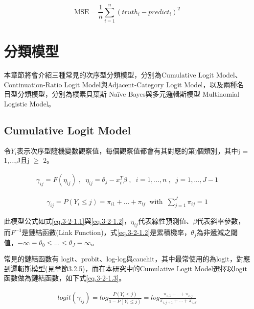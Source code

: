 \begin{equation}\label{eq.1.3.1}
\text{MSE}=\frac{1}{n}\sum_{i=1}^{n}(truth_i-predict_i)^2
\end{equation}
	
	
\section{分類模型}
	
	本章節將會介紹三種常見的次序型分類模型，分別為Cumulative Logit Model、Continuation-Ratio Logit Model與Adjacent-Category Logit Model，以及兩種名目型分類模型，分別為樸素貝葉斯 Naïve Bayes與多元邏輯斯模型 Multinomial Logistic Model。
	
\subsection{Cumulative Logit Model}

	令$Y_i$表示次序型隨機變數觀察值，每個觀察值都會有其對應的第j個類別，其中j = 1,...,\;J且j $\geq $ 2。
	
\begin{equation}
\label{eq.3-2-1.1}
\begin{aligned}
	\gamma_{ij} = F(\eta_{ij})\;,\;\; \eta_{ij} = \theta_j - x^{T}_i\beta \;,\;\; i = 1,...,n\;,\;\; j=1,...,J-1 
\end{aligned}
\end{equation}

\begin{equation}
\label{eq.3-2-1.2}
\begin{aligned}
	\gamma_{ij} = P(Y_i\leq j) = \pi_{i1} + ... + \pi_{ij}\;\; \text{with} \;\; \sum_{j=1}^{J} \pi_{ij} = 1
\end{aligned}
\end{equation}
	
	此模型公式如式\ref{eq.3-2-1.1}與\ref{eq.3-2-1.2}，$\eta_{ij}$代表線性預測值、$\beta$代表斜率參數，而$F^{-1}$是鏈結函數(Link Function)，式\ref{eq.3-2-1.2}是累積機率，$\theta_j$為非遞減之閾值，$\nonumber - \infty \equiv \theta_0 \leq  ... \leq  \theta_J \equiv \infty$。
	

	常見的鏈結函數有 logit、probit、log-log與cauchit，其中最常使用的為logit，對應到邏輯斯模型(見章節3.2.5)，而在本研究中的Cumulative Logit Model選擇以logit函數做為鏈結函數，如下式\ref{eq.3-2-1.3}。
	
\begin{equation}
\label{eq.3-2-1.3}
\begin{aligned}
	logit(\gamma_{ij}) =log \frac{P(Y_i\leq j)}{1-P(Y_i\leq j)} = log \frac{\pi_{i, 1}+..+\pi_{i, j}}{\pi_{i, j+1}+...+\pi_{i, J}}
\end{aligned}
\end{equation}

